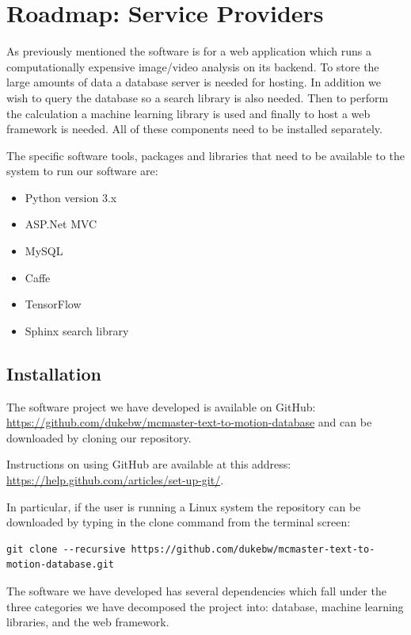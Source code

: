 \documentclass{scrreprt}
\begin{document}
\section{Roadmap: Service Providers}

As previously mentioned the software is for a  web application which runs a
computationally expensive image/video analysis on its backend. To store the
large amounts of data a database server is needed for hosting.  In addition we
wish to query the database so a search library is also needed. Then to perform
the calculation a machine learning library is used and finally to host a web
framework is needed. All of these components need to be installed separately.

The specific software tools, packages and libraries that need to be available
to the system to run our software are:

\begin{itemize}
  \item Python version 3.x
  \item ASP.Net MVC
  \item MySQL
  \item Caffe
  \item TensorFlow
  \item Sphinx search library
\end{itemize}



\subsection{Installation}

The software project we have developed is available on GitHub:
\url{https://github.com/dukebw/mcmaster-text-to-motion-database} and can be
downloaded by cloning our repository.

Instructions on using GitHub are available at this address:
\url{https://help.github.com/articles/set-up-git/}.

In particular, if the user is running a Linux system the repository can be
downloaded by typing in the clone command from the terminal screen:

\begin{verbatim}
git clone --recursive https://github.com/dukebw/mcmaster-text-to-motion-database.git
\end{verbatim}

The software we have developed has several dependencies which fall under the
three categories we have decomposed the project into: database, machine
learning libraries, and the web framework.
\end{document}
